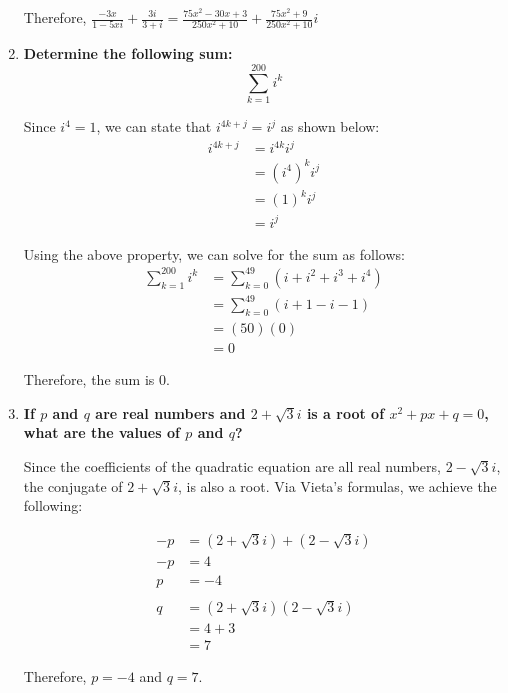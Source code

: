 \documentclass[12pt]{article}
\begin{document}
\begin{enumerate}
    Therefore, $\displaystyle{{\frac{-3x}{1 - 5xi} + \frac{3i}{3 + i}} = \frac{75x^2 - 30x + 3}{250x^2 + 10} + \frac{75x^2 + 9}{250x^2 + 10}i}$
    
    \newpage
    
    \item \textbf{Determine the following sum: $$\sum_{k = 1}^{200} i^k$$}
    
    Since $i^4 = 1$, we can state that $i^{4k + j} = i^j$ as shown below:
    \begin{align*}
        i^{4k + j} &= i^{4k} i^j \\
                &= (i^4)^k i^j \\
                &= (1)^k i^j \\
                &= i^j
    \end{align*}
    
    Using the above property, we can solve for the sum as follows:
    \begin{align*}
        \sum^{200}_{k = 1} i^k &= \sum_{k = 0}^{49} (i + i^2 + i^3 + i^4) \\
        &= \sum_{k = 0}^{49} (i + 1 - i - 1) \\
        &= (50)(0) \\
        &= 0
    \end{align*}
    
    Therefore, the sum is $0$.
    
    \item \textbf{If $p$ and $q$ are real numbers and $2 + \sqrt{3}i$ is a root of $x^2 + px+q=0$, what are the values of $p$ and $q$?}
    
    Since the coefficients of the quadratic equation are all real numbers, $2 - \sqrt{3}i$, the conjugate of $2 + \sqrt{3}i$, is also a root. Via Vieta's formulas, we achieve the following:
    
    \begin{align*}
        -p &= (2 + \sqrt{3}i) + (2 - \sqrt{3}i) \\
        -p &= 4 \\
        p &= -4 \\ \\
        q &= (2 + \sqrt{3}i)(2 - \sqrt{3}i) \\
        &= 4 + 3 \\
        &= 7
    \end{align*}
    
    Therefore, $p = -4$ and $q = 7$.
    
\end{enumerate}
\end{document}
